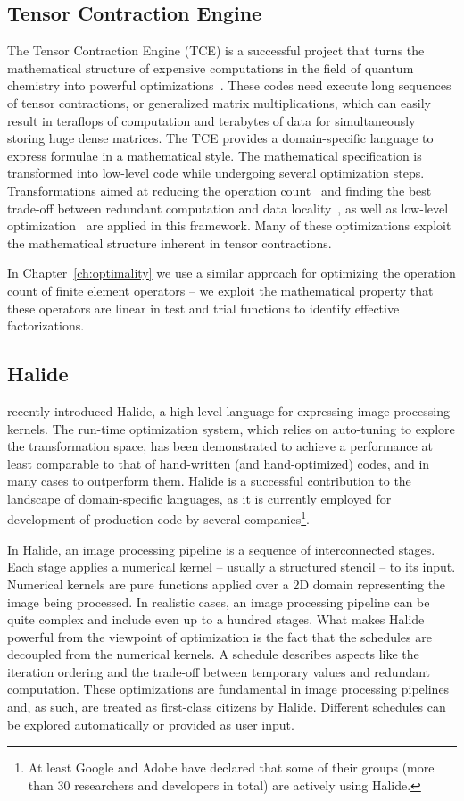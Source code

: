 \subsection{Tensor Contraction Engine}
\label{sec:bkg:tce}
The Tensor Contraction Engine (TCE) is a successful project that turns the mathematical structure of expensive computations in the field of quantum chemistry into powerful optimizations~\citep{TCE-url}. These codes need execute long sequences of tensor contractions, or generalized matrix multiplications, which can easily result in teraflops of computation and terabytes of data for simultaneously storing huge dense matrices. The TCE provides a domain-specific language to express formulae in a mathematical style. The mathematical specification is transformed into low-level code while undergoing several optimization steps. Transformations aimed at reducing the operation count~\citep{TCE-2006,TCE-2009} and finding the best trade-off between redundant computation and data locality~\citep{TCE-2011}, as well as low-level optimization~\citep{TCE-2012} are applied in this framework. Many of these optimizations exploit the mathematical structure inherent in tensor contractions. 

In Chapter~\ref{ch:optimality} we use a similar approach for optimizing the operation count of finite element operators -- we exploit the mathematical property that these operators are linear in test and trial functions to identify effective factorizations.


\subsection{Halide}
\cite{Halide} recently introduced Halide, a high level language for expressing image processing kernels. The run-time optimization system, which relies on auto-tuning to explore the transformation space, has been demonstrated to achieve a performance at least comparable to that of hand-written (and hand-optimized) codes, and in many cases to outperform them. Halide is a successful contribution to the landscape of domain-specific languages, as it is currently employed for development of production code by several companies\footnote{At least Google and Adobe have declared that some of their groups (more than 30 researchers and developers in total) are actively using Halide.}.

In Halide, an image processing pipeline is a sequence of interconnected stages. Each stage applies a numerical kernel -- usually a structured stencil -- to its input. Numerical kernels are pure functions applied over a 2D domain representing the image being processed. In realistic cases, an image processing pipeline can be quite complex and include even up to a hundred stages. What makes Halide powerful from the viewpoint of optimization is the fact that the schedules are decoupled from the numerical kernels. A schedule describes aspects like the iteration ordering and the trade-off between temporary values and redundant computation. These optimizations are fundamental in image processing pipelines and, as such, are treated as first-class citizens by Halide. Different schedules can be explored automatically or provided as user input.


